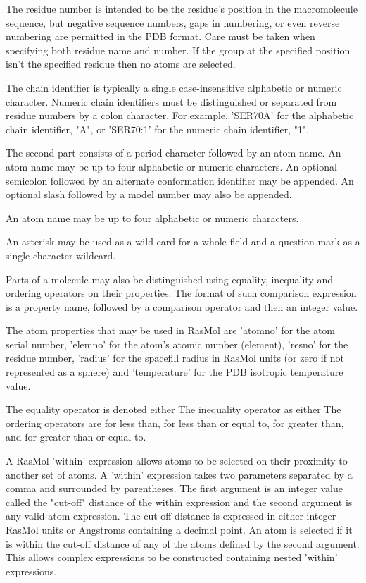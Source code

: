 The residue number is intended to be the residue's position in
the macromolecule sequence, but negative sequence numbers, gaps
in numbering, or even reverse numbering are permitted in the PDB format.
Care must be taken when specifying both residue name and number.
If the group at the specified position isn't the specified residue
then no atoms are selected.

The chain identifier is typically a single case-insensitive
alphabetic or numeric character. Numeric chain identifiers must
be distinguished or separated from residue numbers by a colon
character. For example,
'SER70A'
for the alphabetic chain identifier, "A", or
'SER70:1'
for the numeric chain identifier, "1".

The second part consists of a period character followed by an atom
name.  An atom name may be up to four alphabetic or numeric characters.
An optional semicolon followed by an alternate conformation
identifier may be appended.  An optional slash followed by a
model number may also be appended.

An atom name may be up to four alphabetic or numeric characters.

An asterisk may be used as a wild card for a whole field and a
question mark as a single character wildcard.

Parts of a molecule may also be distinguished using equality,
inequality and ordering operators on their properties. The format
of such comparison expression is a property name, followed by a
comparison operator and then an integer value.

The atom properties that may be used in RasMol are
'atomno'
for the atom serial number,
'elemno'
for the atom's atomic number (element),
'resno'
for the residue number,
'radius'
for the spacefill radius in RasMol units (or zero if not represented
as a sphere) and
'temperature'
for the PDB isotropic temperature value.

The equality operator is denoted either
The inequality operator as either
The ordering operators are
for less than,
for less than or equal to,
for greater than, and
for greater than or equal to.

A RasMol
'within'
expression allows atoms to be selected on their proximity to
another set of atoms. A
'within'
expression takes two parameters separated by a comma and surrounded
by parentheses. The first argument is an integer value called the
"cut-off" distance of the within expression and the second argument
is any  valid atom expression. The cut-off distance is expressed in
either integer RasMol units or Angstroms containing a decimal point.
An atom is selected if it is within the cut-off distance of any of
the atoms defined by the second argument. This allows complex
expressions to be constructed containing nested
'within'
expressions.

